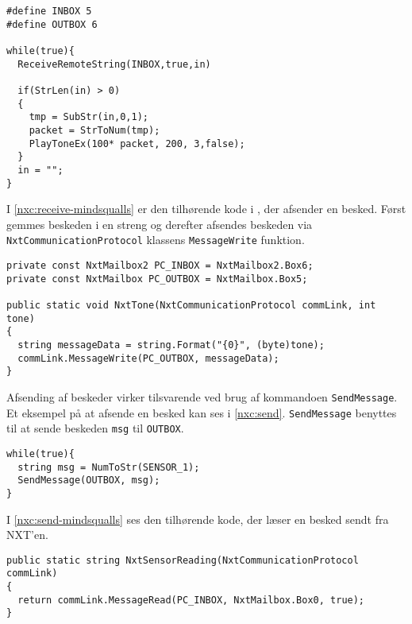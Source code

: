 \begin{lstlisting}[style=c,label=nxc:receive,caption={Et eksempel på at modtage beskeder over Bluetooth.}]
#define INBOX 5
#define OUTBOX 6

while(true){
  ReceiveRemoteString(INBOX,true,in)
  
  if(StrLen(in) > 0)
  {
    tmp = SubStr(in,0,1);
    packet = StrToNum(tmp);
    PlayToneEx(100* packet, 200, 3,false);
  }
  in = "";
}
\end{lstlisting}

I \cref{nxc:receive-mindsqualls} er den tilhørende kode i \mindsqualls, der afsender en besked.
Først gemmes beskeden i en streng og derefter afsendes beskeden via \lstinline[style=csharp]!NxtCommunicationProtocol! klassens \lstinline[style=csharp]!MessageWrite! funktion.

\begin{lstlisting}[style=c,breaklines=true, label=nxc:receive-mindsqualls,caption={\mindsqualls kode der afsender en besked.}]
private const NxtMailbox2 PC_INBOX = NxtMailbox2.Box6;
private const NxtMailbox PC_OUTBOX = NxtMailbox.Box5;

public static void NxtTone(NxtCommunicationProtocol commLink, int tone)
{
  string messageData = string.Format("{0}", (byte)tone);
  commLink.MessageWrite(PC_OUTBOX, messageData);
}
\end{lstlisting}

Afsending af beskeder virker tilsvarende ved brug af kommandoen \lstinline[style=c]|SendMessage|.
Et eksempel på at afsende en besked kan ses i \cref{nxc:send}.
\lstinline[style=c]|SendMessage| benyttes til at sende beskeden \lstinline[style=c]|msg| til \lstinline[style=c]!OUTBOX!.

\begin{lstlisting}[style=c,label=nxc:send,caption={Eksempel på afsending af besked.}]
while(true){
  string msg = NumToStr(SENSOR_1);
  SendMessage(OUTBOX, msg);
}
\end{lstlisting}

I \cref{nxc:send-mindsqualls} ses den tilhørende \mindsqualls kode, der læser en besked sendt fra NXT'en.

\begin{lstlisting}[style=c,breaklines=true,label=nxc:send-mindsqualls,caption={\mindsqualls kode der læser en besked sendt fra NXT'en.}]
public static string NxtSensorReading(NxtCommunicationProtocol commLink)
{
  return commLink.MessageRead(PC_INBOX, NxtMailbox.Box0, true);
}
\end{lstlisting}
